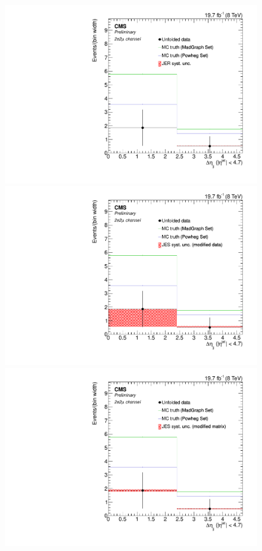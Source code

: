\begin{figure}[hbtp]
\begin{center}
   \includegraphics[width=0.8\cmsFigWidth]{Figures/Unfolding/Systematics/ZZTo2e2m_Deta_JER_Mad_fr}
   \includegraphics[width=0.8\cmsFigWidth]{Figures/Unfolding/Systematics/ZZTo2e2m_Deta_JES_ModData_Mad_fr}     
   \includegraphics[width=0.8\cmsFigWidth]{Figures/Unfolding/Systematics/ZZTo2e2m_Deta_JES_ModMat_Mad_fr}

\end{center}
\end{figure}
